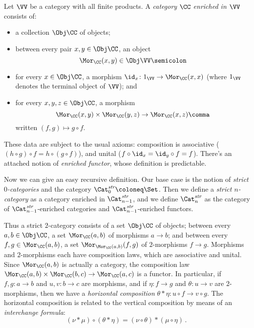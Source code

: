 Let $\VV$ be a category with all finite products.
A \emph{category $\CC$ enriched in $\VV$} consists of:
\begin{itemize}
  \item a collection $\Obj \CC$ of objects;
  \item between every pair $x,y \in \Obj \CC$, an object
  \[
    \Mor_{\CC}(x,y) \in \Obj \VV \semicolon
  \]
  \item for every $x \in \Obj \CC$, a morphism $\id_x \colon 1_{\VV} \to \Mor_{\CC}(x,x)$ (where $1_{\VV}$ denotes the terminal object of $\VV$); and
  \item for every $x,y,z \in \Obj \CC$, a morphism
    \[
      \Mor_{\CC}(x,y) \times \Mor_{\CC}(y,z) \to \Mor_{\CC}(x,z) \comma
    \]
    written $(f,g) \mapsto g \circ f$.
\end{itemize}
These data are subject to the usual axioms: composition is associative ($(h \circ g) \circ f = h \circ (g \circ f)$), and unital ($f \circ \id_x = \id_y \circ f = f$).
There's an attached notion of \emph{enriched functor}, whose definition is predictable.

Now we can give an easy recursive definition.
Our base case is the notion of \emph{strict $0$-categories} and the category $\Cat^{\textit{str}}_0 \coloneq \Set$.
Then we define a \emph{strict $n$-category} as a category enriched in $\Cat^{\textit{str}}_{n-1}$,
and we define $\Cat^{\textit{str}}_n$ as the category of $\Cat^{\textit{str}}_{n-1}$-enriched categories and $\Cat^{\textit{str}}_{n-1}$-enriched functors.

Thus a strict $2$-category consists of a set $\Obj \CC$ of objects;
between every $a,b \in \Obj \CC$, a set $\Mor_{\CC}(a,b)$ of morphisms $a \to b$; and
between every $f,g \in \Mor_{\CC}(a,b)$, a set $\Mor_{\Mor_{\CC}(a,b)}(f,g)$ of $2$-morphisms $f \to g$.
Morphisms and $2$-morphisms each have composition laws, which are associative and unital.
Since $\Mor_{\CC}(a,b)$ is actually a category, the composition law $\Mor_{\CC}(a,b) \times \Mor_{\CC}(b,c) \to \Mor_{\CC}(a,c)$ is a functor.
In particular, if $f,g \colon a \to b$ and $u,v \colon b \to c$ are morphisms,
and if $\eta \colon f \to g$ and $\theta \colon u \to v$ are $2$-morphisms, then we have a \emph{horizontal composition} $\theta \ast \eta \colon u \circ f \to v \circ g$. 
The horizontal composition is related to the vertical composition by means of an \emph{interchange formula}:
\[
  (\nu \ast \mu) \circ (\theta \ast \eta) = (\nu \circ \theta) \ast (\mu \circ \eta) \period
\]


